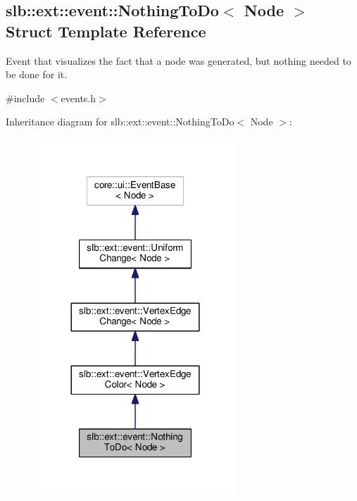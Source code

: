 \hypertarget{structslb_1_1ext_1_1event_1_1NothingToDo}{}\subsection{slb\+:\+:ext\+:\+:event\+:\+:Nothing\+To\+Do$<$ Node $>$ Struct Template Reference}
\label{structslb_1_1ext_1_1event_1_1NothingToDo}


Event that visualizes the fact that a node was generated, but nothing needed to be done for it.  




{\ttfamily \#include $<$events.\+h$>$}



Inheritance diagram for slb\+:\+:ext\+:\+:event\+:\+:Nothing\+To\+Do$<$ Node $>$\+:\nopagebreak
\begin{figure}[H]
\begin{center}
\leavevmode
\includegraphics[width=216pt]{structslb_1_1ext_1_1event_1_1NothingToDo__inherit__graph}
\end{center}
\end{figure}


